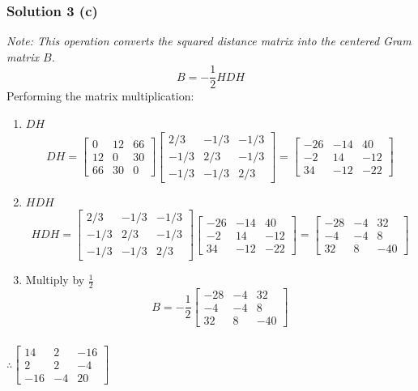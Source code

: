 \documentclass{article}
\begin{document}
\subsubsection*{Solution 3 (c)}
\textit{Note: This operation converts the squared distance matrix into the centered Gram matrix $B$.}
$$ B = -\frac{1}{2} H D H $$
Performing the matrix multiplication:
\begin{enumerate}
    \item $DH$
        $$DH = \begin{bmatrix} 0 & 12 & 66 \\ 12 & 0 & 30 \\ 66 & 30 & 0 \end{bmatrix} \begin{bmatrix} 2/3 & -1/3 & -1/3 \\ -1/3 & 2/3 & -1/3 \\ -1/3 & -1/3 & 2/3 \end{bmatrix} = \begin{bmatrix} -26 & -14 & 40 \\ -2 & 14 & -12 \\ 34 & -12 & -22 \end{bmatrix}$$
    \item $H DH$
        $$H DH = \begin{bmatrix} 2/3 & -1/3 & -1/3 \\ -1/3 & 2/3 & -1/3 \\ -1/3 & -1/3 & 2/3 \end{bmatrix} \begin{bmatrix} -26 & -14 & 40 \\ -2 & 14 & -12 \\ 34 & -12 & -22 \end{bmatrix} = \begin{bmatrix} -28 & -4 & 32 \\ -4 & -4 & 8 \\ 32 & 8 & -40 \end{bmatrix}$$
    \item Multiply by $\frac{1}{2}$
    $$ B = -\frac{1}{2} \begin{bmatrix} -28 & -4 & 32 \\ -4 & -4 & 8 \\ 32 & 8 & -40 \end{bmatrix} $$
\end{enumerate}

\subsubsection*{\normalfont}{$\therefore \begin{bmatrix} 14 & 2 & -16 \\ 2 & 2 & -4 \\ -16 & -4 & 20 \end{bmatrix}$}
\end{document}
